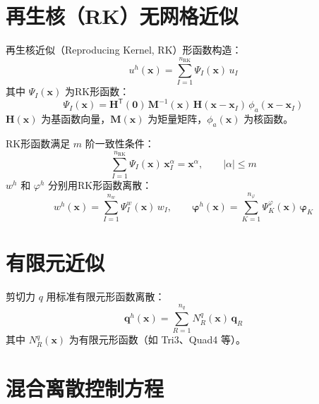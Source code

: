 \documentclass[internationalmaster]{hquThesis}
\begin{document}
\section{再生核（RK）无网格近似}

再生核近似（Reproducing Kernel, RK）形函数构造：
\begin{equation}
    u^{h}(\boldsymbol x) = \sum_{I=1}^{n_{\mathrm{RK}}}\Psi_I(\boldsymbol x)\,u_I
    \label{eq:rk-approx}
\end{equation}
其中 $\Psi_I(\boldsymbol x)$ 为RK形函数：
\begin{equation}
    \Psi_I(\boldsymbol x) = \boldsymbol H^{\mathsf{T}}(\boldsymbol 0)\,\boldsymbol M^{-1}(\boldsymbol x)\,\boldsymbol H(\boldsymbol x-\boldsymbol x_I)\,\phi_a(\boldsymbol x-\boldsymbol x_I)
    \label{eq:rk-shape}
\end{equation}
$\boldsymbol H(\boldsymbol x)$ 为基函数向量，$\boldsymbol M(\boldsymbol x)$ 为矩量矩阵，$\phi_a(\boldsymbol x)$ 为核函数。

RK形函数满足 $m$ 阶一致性条件：
\begin{equation}
    \sum_{I=1}^{n_{\mathrm{RK}}}\Psi_I(\boldsymbol x)\,\boldsymbol x_I^{\alpha} = \boldsymbol x^{\alpha}, \qquad |\alpha|\leq m
    \label{eq:rk-consistency}
\end{equation}
$w^{h}$ 和 $\varphi^{h}$ 分别用RK形函数离散：
\begin{equation}
    w^{h}(\boldsymbol x) = \sum_{I=1}^{n_w}\Psi_I^{w}(\boldsymbol x)\,w_I, \qquad
    \boldsymbol{\varphi}^{h}(\boldsymbol x) = \sum_{K=1}^{n_\varphi}\Psi_K^{\varphi}(\boldsymbol x)\,\boldsymbol{\varphi}_K
    \label{eq:rk-wphi}
\end{equation}

\section{有限元近似}

剪切力 $q$ 用标准有限元形函数离散：
\begin{equation}
    \boldsymbol q^{h}(\boldsymbol x) = \sum_{R=1}^{n_q}N_R^{q}(\boldsymbol x)\,\boldsymbol q_R
    \label{eq:fe-q}
\end{equation}
其中 $N_R^{q}(\boldsymbol x)$ 为有限元形函数（如 Tri3、Quad4 等）。

\section{混合离散控制方程}
\end{document}
